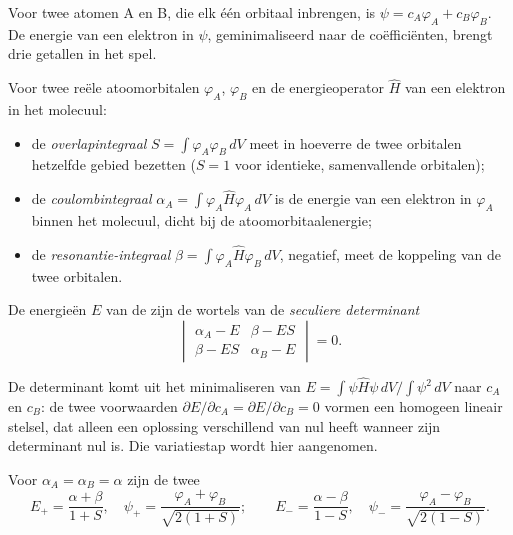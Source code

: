 Voor twee atomen A en B, die elk één orbitaal inbrengen, is $\psi = c_A\varphi_A + c_B\varphi_B$.
De energie van een elektron in $\psi$, geminimaliseerd naar de coëfficiënten,
brengt drie getallen in het spel.

\begin{definition}\label{def:b2:diatomic-mos:integrals}
Voor twee reële atoomorbitalen $\varphi_A$, $\varphi_B$ en de energieoperator $\hat H$
van een elektron in het molecuul:
\begin{itemize}
  \item de \emph{overlapintegraal} $S = \int\varphi_A\varphi_B\,dV$
        meet in hoeverre de twee orbitalen hetzelfde gebied bezetten ($S = 1$ voor
        identieke, samenvallende orbitalen);
  \item de \emph{coulombintegraal} $\alpha_A = \int\varphi_A\hat
        H\varphi_A\,dV$ is de energie van een elektron in $\varphi_A$ binnen het molecuul,
        dicht bij de atoomorbitaalenergie;
  \item de \emph{resonantie-integraal} $\beta = \int\varphi_A\hat
        H\varphi_B\,dV$, negatief, meet de koppeling van de twee orbitalen.
\end{itemize}
De energieën $E$ van de  zijn de wortels van de \emph{seculiere
determinant}
\[
  \begin{vmatrix} \alpha_A - E & \beta - ES \\ \beta - ES & \alpha_B - E \end{vmatrix} = 0 .
\]
\end{definition}

De determinant komt uit het minimaliseren van $E = \int\psi\hat H\psi\,dV/\int\psi^2\,dV$
naar $c_A$ en $c_B$: de twee voorwaarden $\partial E/\partial c_A =
\partial E/\partial c_B = 0$ vormen een homogeen lineair stelsel, dat alleen een oplossing
verschillend van nul heeft wanneer zijn determinant nul is. Die variatiestap wordt hier
aangenomen.

\begin{theorem}\label{thm:b2:diatomic-mos:homonuclear}
Voor $\alpha_A = \alpha_B = \alpha$ zijn de twee 
\[
  E_+ = \frac{\alpha + \beta}{1 + S}, \quad \psi_+ = \frac{\varphi_A + \varphi_B}{\sqrt{2(1 + S)}} ;
  \qquad
  E_- = \frac{\alpha - \beta}{1 - S}, \quad \psi_- = \frac{\varphi_A - \varphi_B}{\sqrt{2(1 - S)}} .
\]
\end{theorem}

